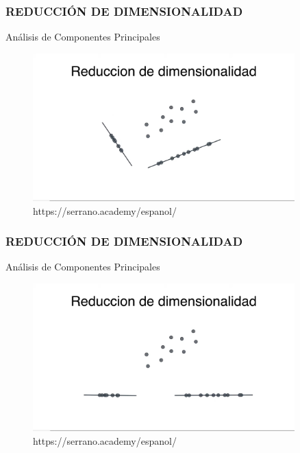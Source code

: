 \documentclass{beamer}
\begin{document}
\begin{frame}
	\frametitle{REDUCCIÓN DE DIMENSIONALIDAD}
	\begin{block}{Análisis de Componentes Principales}	
		\begin{figure}
			\includegraphics[width=0.9\textwidth]{PCA/IMG_3533.jpg}
			\caption{https://serrano.academy/espanol/}
		\end{figure}
	\end{block}
\end{frame}

\begin{frame}
	\frametitle{REDUCCIÓN DE DIMENSIONALIDAD}
	\begin{block}{Análisis de Componentes Principales}	
		\begin{figure}
			\includegraphics[width=0.9\textwidth]{PCA/IMG_3534.jpg}
			\caption{https://serrano.academy/espanol/}
		\end{figure}
	\end{block}
\end{frame}
\end{document}
